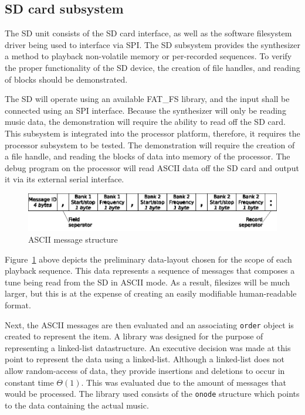 \documentclass[bibtotocnumbered,abstract=on,paper=a4,fontsize=12pt,parskip=on,halfparskip=on]{scrartcl}		%
\begin{document}
  \subsection{SD card subsystem}

   The SD unit consists of the SD card interface, as well as the software filesystem driver being used to interface via SPI. The SD subsystem provides the synthesizer a method to playback non-volatile memory or per-recorded sequences. To verify the proper functionality of the SD device, the creation of file handles, and reading of blocks should be demonstrated.

    The SD will operate using an available FAT\_FS \cite{website:fatfsnotes} library, and the input shall be connected using an SPI  interface. Because the synthesizer will only be reading music data, the demonstration will require the ability to read off the SD card. This subsystem is integrated into the processor platform, therefore, it requires the processor subsystem to be tested. The demonstration will require the creation of a file handle, and reading the blocks of data into memory of the processor. The debug program on the processor will read ASCII data off the SD card and output it via its external serial interface.\\

    \begin{figure}[h!]
      \centering
        \includegraphics[]{img/fig_asciimessage}
        \caption{ASCII message structure}
        \label{fig_asciimessage}
    \end{figure}

    Figure~\ref{fig_asciimessage} above depicts the preliminary data-layout chosen for the scope of each playback sequence. This data represents a sequence of messages that composes a tune being read from the SD in ASCII mode. As a result, filesizes will be much larger, but this is at the expense of creating an easily modifiable human-readable format. 

    Next, the ASCII messages are then evaluated and an associating \texttt{order} object is created to represent the item. A library was designed for the purpose of representing a linked-list datastructure. An executive decision was made at this point to represent the data using a linked-list. Although a linked-list does not allow random-access of data, they provide insertions and deletions to occur in constant time $ \Theta(1) $\cite{sedgewick2011algorithms}. This was evaluated due to the amount of messages that would be processed. The library used consists of the \texttt{onode} structure which points to the data containing the actual music.
\end{document}
